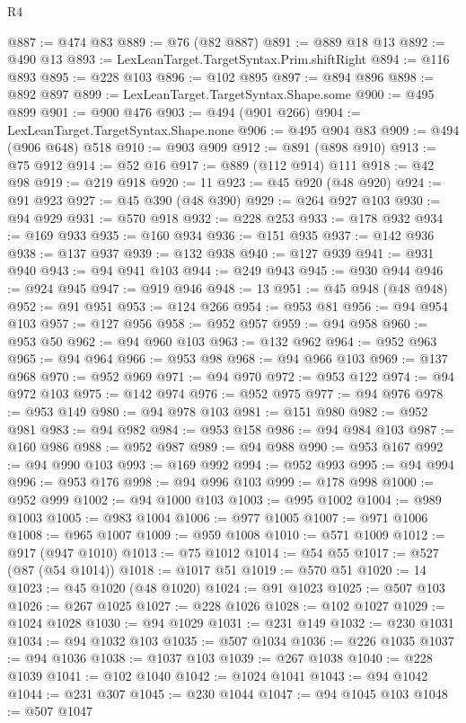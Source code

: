 \begin{lexlean}{R4}
\begin{coremodule}
@887 := @474 @83
@889 := @76 (@82 @887)
@891 := @889 @18 @13
@892 := @490 @13
@893 := LexLeanTarget.TargetSyntax.Prim.shiftRight
@894 := @116 @893
@895 := @228 @103
@896 := @102 @895
@897 := @894 @896
@898 := @892 @897
@899 := LexLeanTarget.TargetSyntax.Shape.some
@900 := @495 @899
@901 := @900 @476
@903 := @494 (@901 @266)
@904 := LexLeanTarget.TargetSyntax.Shape.none
@906 := @495 @904 @83
@909 := @494 (@906 @648) @518
@910 := @903 @909
@912 := @891 (@898 @910)
@913 := @75 @912
@914 := @52 @16
@917 := @889 (@112 @914) @111
@918 := @42 @98
@919 := @219 @918
@920 := 11
@923 := @45 @920 (@48 @920)
@924 := @91 @923
@927 := @45 @390 (@48 @390)
@929 := @264 @927 @103
@930 := @94 @929
@931 := @570 @918
@932 := @228 @253
@933 := @178 @932
@934 := @169 @933
@935 := @160 @934
@936 := @151 @935
@937 := @142 @936
@938 := @137 @937
@939 := @132 @938
@940 := @127 @939
@941 := @931 @940
@943 := @94 @941 @103
@944 := @249 @943
@945 := @930 @944
@946 := @924 @945
@947 := @919 @946
@948 := 13
@951 := @45 @948 (@48 @948)
@952 := @91 @951
@953 := @124 @266
@954 := @953 @81
@956 := @94 @954 @103
@957 := @127 @956
@958 := @952 @957
@959 := @94 @958
@960 := @953 @50
@962 := @94 @960 @103
@963 := @132 @962
@964 := @952 @963
@965 := @94 @964
@966 := @953 @98
@968 := @94 @966 @103
@969 := @137 @968
@970 := @952 @969
@971 := @94 @970
@972 := @953 @122
@974 := @94 @972 @103
@975 := @142 @974
@976 := @952 @975
@977 := @94 @976
@978 := @953 @149
@980 := @94 @978 @103
@981 := @151 @980
@982 := @952 @981
@983 := @94 @982
@984 := @953 @158
@986 := @94 @984 @103
@987 := @160 @986
@988 := @952 @987
@989 := @94 @988
@990 := @953 @167
@992 := @94 @990 @103
@993 := @169 @992
@994 := @952 @993
@995 := @94 @994
@996 := @953 @176
@998 := @94 @996 @103
@999 := @178 @998
@1000 := @952 @999
@1002 := @94 @1000 @103
@1003 := @995 @1002
@1004 := @989 @1003
@1005 := @983 @1004
@1006 := @977 @1005
@1007 := @971 @1006
@1008 := @965 @1007
@1009 := @959 @1008
@1010 := @571 @1009
@1012 := @917 (@947 @1010)
@1013 := @75 @1012
@1014 := @54 @55
@1017 := @527 (@87 (@54 @1014))
@1018 := @1017 @51
@1019 := @570 @51
@1020 := 14
@1023 := @45 @1020 (@48 @1020)
@1024 := @91 @1023
@1025 := @507 @103
@1026 := @267 @1025
@1027 := @228 @1026
@1028 := @102 @1027
@1029 := @1024 @1028
@1030 := @94 @1029
@1031 := @231 @149
@1032 := @230 @1031
@1034 := @94 @1032 @103
@1035 := @507 @1034
@1036 := @226 @1035
@1037 := @94 @1036
@1038 := @1037 @103
@1039 := @267 @1038
@1040 := @228 @1039
@1041 := @102 @1040
@1042 := @1024 @1041
@1043 := @94 @1042
@1044 := @231 @307
@1045 := @230 @1044
@1047 := @94 @1045 @103
@1048 := @507 @1047

\end{coremodule}
\end{lexlean}

